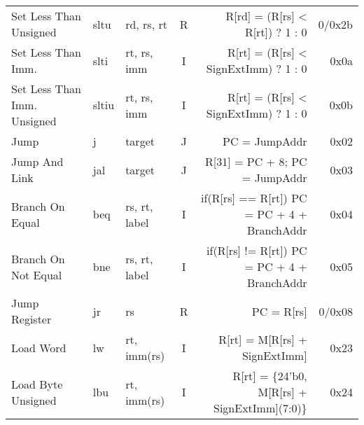 \begin{tabularx}{\textwidth}{lMAcDr}
    Set Less Than Unsigned                                                          & sltu   & rd, rs, rt    & R &
    R[rd] = (R[rs] < R[rt]) ? 1 : 0                \footnotemark[6]                 & 0/0x2b                       \\
    Set Less Than Imm.                                                              & slti   & rt, rs, imm   & I &
    R[rt] = (R[rs] < SignExtImm) ? 1 : 0           \footnotemark[2]                 & 0x0a                         \\
    Set Less Than Imm. Unsigned                                                     & sltiu  & rt, rs, imm   & I &
    R[rt] = (R[rs] < SignExtImm) ? 1 : 0           \footnotemark[2]\footnotemark[6] & 0x0b                         \\
    \midrule
    Jump                                                                            & j      & target        & J &
    PC = JumpAddr                                  \footnotemark[5]                 & 0x02                         \\
    Jump And Link                                                                   & jal    & target        & J &
    R[31] = PC + 8; PC = JumpAddr                  \footnotemark[5]                 & 0x03                         \\
    Branch On Equal                                                                 & beq    & rs, rt, label & I &
    if(R[rs] == R[rt]) PC = PC + 4 + BranchAddr    \footnotemark[4]                 & 0x04                         \\
    Branch On Not Equal                                                             & bne    & rs, rt, label & I &
    if(R[rs] != R[rt]) PC = PC + 4 + BranchAddr    \footnotemark[4]                 & 0x05                         \\
    Jump Register                                                                   & jr     & rs            & R &
    PC = R[rs]                                                                      & 0/0x08                       \\
    \midrule
    Load Word                                                                       & lw     & rt, imm(rs)   & I &
    R[rt] = M[R[rs] + SignExtImm]                  \footnotemark[2]                 & 0x23                         \\
    Load Byte Unsigned                                                              & lbu    & rt, imm(rs)   & I &
    R[rt] = \{24'b0, M[R[rs] + SignExtImm](7:0)\}  \footnotemark[2]                 & 0x24                         \\

\end{tabularx}
